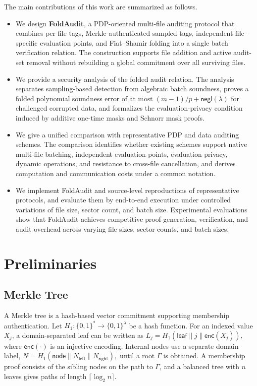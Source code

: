\documentclass[lettersize,journal]{IEEEtran}
\begin{document}
The main contributions of this work are summarized as follows.
\begin{itemize}
    \item We design \textbf{FoldAudit}, a PDP-oriented multi-file auditing protocol that combines per-file tags, Merkle-authenticated sampled tags, independent file-specific evaluation points, and Fiat--Shamir folding into a single batch verification relation. The construction supports file addition and active audit-set removal without rebuilding a global commitment over all surviving files.

    \item We provide a security analysis of the folded audit relation. The analysis separates sampling-based detection from algebraic batch soundness, proves a folded polynomial soundness error of at most $(m-1)/p+\mathsf{negl}(\lambda)$ for challenged corrupted data, and formalizes the evaluation-privacy condition induced by additive one-time masks and Schnorr mask proofs.

    \item We give a unified comparison with representative PDP and data auditing schemes. The comparison identifies whether existing schemes support native multi-file batching, independent evaluation points, evaluation privacy, dynamic operations, and resistance to cross-file cancellation, and derives computation and communication costs under a common notation.

    \item We implement FoldAudit and source-level reproductions of representative protocols, and evaluate them by end-to-end execution under controlled variations of file size, sector count, and batch size. Experimental evaluations show that FoldAudit achieves competitive proof-generation, verification, and audit overhead across varying file sizes, sector counts, and batch sizes. 
\end{itemize}

\section{Preliminaries}
\label{sec:preliminaries}

\subsection{Merkle Tree}
A Merkle tree is a hash-based vector commitment supporting membership authentication. Let $H_1:\{0,1\}^*\rightarrow\{0,1\}^{\lambda}$ be a hash function. For an indexed value \(X_j\), a domain-separated leaf can be written as
$L_j=H_1(\mathsf{leaf}\|j\|\mathsf{enc}(X_j)),$
where \(\mathsf{enc}(\cdot)\) is an injective encoding. Internal nodes use a separate domain label,
$
N=H_1(\mathsf{node}\|N_{\mathsf{left}}\|N_{\mathsf{right}}),
$
until a root \(\Gamma\) is obtained. A membership proof consists of the sibling nodes on the path to \(\Gamma\), and a balanced tree with \(n\) leaves gives paths of length \(\lceil\log_2 n\rceil\).
\end{document}
